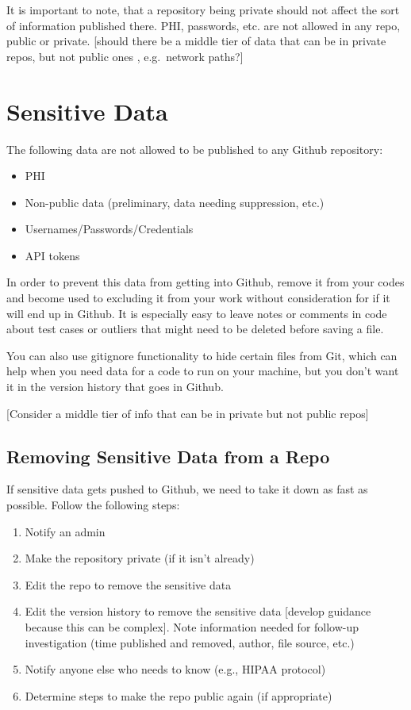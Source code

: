 \documentclass[
  letterpaper,
  DIV=11,
  numbers=noendperiod]{scrreprt}
\begin{document}
It is important to note, that a repository being private should not
affect the sort of information published there. PHI, passwords, etc. are
not allowed in any repo, public or private. {[}should there be a middle
tier of data that can be in private repos, but not public ones ,
e.g.~network paths?{]}

\hypertarget{sensitive-data}{%
\section{Sensitive Data}\label{sensitive-data}}

The following data are not allowed to be published to any Github
repository:

\begin{itemize}
\item
  PHI
\item
  Non-public data (preliminary, data needing suppression, etc.)
\item
  Usernames/Passwords/Credentials
\item
  API tokens
\end{itemize}

In order to prevent this data from getting into Github, remove it from
your codes and become used to excluding it from your work without
consideration for if it will end up in Github. It is especially easy to
leave notes or comments in code about test cases or outliers that might
need to be deleted before saving a file.

You can also use gitignore functionality to hide certain files from Git,
which can help when you need data for a code to run on your machine, but
you don't want it in the version history that goes in Github.

{[}Consider a middle tier of info that can be in private but not public
repos{]}

\hypertarget{removing-sensitive-data-from-a-repo}{%
\subsection{Removing Sensitive Data from a
Repo}\label{removing-sensitive-data-from-a-repo}}

If sensitive data gets pushed to Github, we need to take it down as fast
as possible. Follow the following steps:

\begin{enumerate}
\def\labelenumi{\arabic{enumi}.}
\item
  Notify an admin
\item
  Make the repository private (if it isn't already)
\item
  Edit the repo to remove the sensitive data
\item
  Edit the version history to remove the sensitive data {[}develop
  guidance because this can be complex{]}. Note information needed for
  follow-up investigation (time published and removed, author, file
  source, etc.)
\item
  Notify anyone else who needs to know (e.g., HIPAA protocol)
\item
  Determine steps to make the repo public again (if appropriate)
\end{enumerate}
\end{document}
